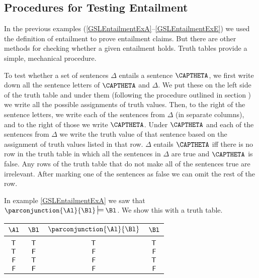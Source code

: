 \subsection{Procedures for Testing Entailment}\label{TestingEntailment}

In the previous examples (\ref{GSLEntailmentExA}--\ref{GSLEntailmentExE}) we used the definition of entailment to prove entailment claims. 
But there are other methods for checking whether a given entailment holds.
Truth tables provide a simple, mechanical procedure.

To test whether a set of sentences $\Delta$ entails a sentence $\CAPTHETA$, we first write down all the sentence letters of $\CAPTHETA$ and $\Delta$. 
We put these on the left side of the truth table and under them (following the procedure outlined in section ) we write all the possible assignments of truth values. 
Then, to the right of the sentence letters, we write each of the sentences from $\Delta$ (in separate columns), and to the right of those we write $\CAPTHETA$. 
Under $\CAPTHETA$ and each of the sentences from $\Delta$ we write the truth value of that sentence based on the assignment of truth values listed in that row. 
$\Delta$ entails $\CAPTHETA$ iff there is no row in the truth table in which all the sentences in $\Delta$ are true and $\CAPTHETA$ is false.
Any rows of the truth table that do not make all of the  sentences true are irrelevant.
After marking one of the  sentences as false we can omit the rest of the row.
\begin{majorILnc}{}
In example \ref{GSLEntailmentExA} we saw that $\parconjunction{\Al}{\Bl}\sdtstile{}{}\Bl$. 
We show this with a truth table.  
\begin{center}
\begin{tabular}{ c c c c }
$\Al$ & $\Bl$ & $\parconjunction{\Al}{\Bl}$ & $\Bl$ \\
\hline
$ $ & $ $ & & \\[-.25cm]
$\mathsf{T}$ & $\mathsf{T}$ & $\mathsf{T}$ & $\mathsf{T}$ \\
$\mathsf{T}$ & $\mathsf{F}$& $\mathsf{F}$ & $\mathsf{F}$ \\
$\mathsf{F}$ & $\mathsf{T}$ & $\mathsf{F}$ & $\mathsf{T}$ \\
$\mathsf{F}$ & $\mathsf{F}$  & $\mathsf{F}$ & $\mathsf{F}$ \\
\end{tabular}
\end{center}
\end{majorILnc}
